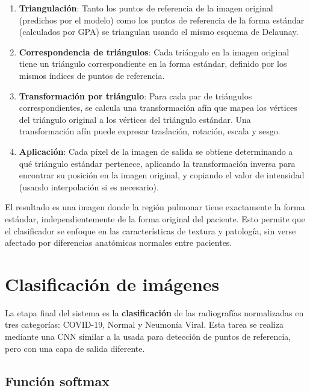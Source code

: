 \begin{enumerate}
    \item \textbf{Triangulación}: Tanto los puntos de referencia de la imagen original (predichos por el modelo) como los puntos de referencia de la forma estándar (calculados por GPA) se triangulan usando el mismo esquema de Delaunay.

    \item \textbf{Correspondencia de triángulos}: Cada triángulo en la imagen original tiene un triángulo correspondiente en la forma estándar, definido por los mismos índices de puntos de referencia.

    \item \textbf{Transformación por triángulo}: Para cada par de triángulos correspondientes, se calcula una transformación afín que mapea los vértices del triángulo original a los vértices del triángulo estándar. Una transformación afín puede expresar traslación, rotación, escala y sesgo.

    \item \textbf{Aplicación}: Cada píxel de la imagen de salida se obtiene determinando a qué triángulo estándar pertenece, aplicando la transformación inversa para encontrar su posición en la imagen original, y copiando el valor de intensidad (usando interpolación si es necesario).
\end{enumerate}

El resultado es una imagen donde la región pulmonar tiene exactamente la forma estándar, independientemente de la forma original del paciente. Esto permite que el clasificador se enfoque en las características de textura y patología, sin verse afectado por diferencias anatómicas normales entre pacientes.

\section{Clasificación de imágenes}
\label{sec:clasificacion_v2}

La etapa final del sistema es la \textbf{clasificación} de las radiografías normalizadas en tres categorías: COVID-19, Normal y Neumonía Viral. Esta tarea se realiza mediante una CNN similar a la usada para detección de puntos de referencia, pero con una capa de salida diferente.

\subsection{Función softmax}

